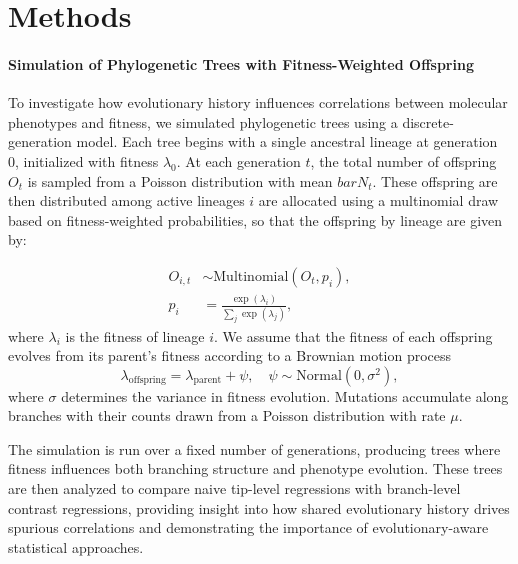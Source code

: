

\section{Methods}

\paragraph{Simulation of Phylogenetic Trees with Fitness-Weighted Offspring}%

To investigate how evolutionary history influences correlations between molecular phenotypes and fitness, we simulated phylogenetic trees using a discrete-generation model.
Each tree begins with a single ancestral lineage at generation 0, initialized with fitness $\lambda_0$.
At each generation $t$, the total number of offspring $O_{t}$ is sampled from a Poisson distribution with mean $bar{N}_t$.
These offspring are then distributed among active lineages $i$ are allocated using a multinomial draw based on fitness-weighted probabilities, so that the offspring by lineage are given by:

\begin{align*}
    O_{i, t} &\sim \text{Multinomial}\left(O_t, p_{i}\right),\\
    p_i &= \frac{\exp(\lambda_i)}{\sum_j \exp(\lambda_j)},
\end{align*}
where $\lambda_i$ is the fitness of lineage $i$.
We assume that the fitness of each offspring evolves from its parent’s fitness according to a Brownian motion process
\begin{equation*}
    \lambda_{\text{offspring}} = \lambda_{\text{parent}} + \psi, \quad \psi \sim \text{Normal}(0, \sigma^2),
\end{equation*}
where $\sigma$ determines the variance in fitness evolution.
Mutations accumulate along branches with their counts drawn from a Poisson distribution with rate $\mu$.

The simulation is run over a fixed number of generations, producing trees where fitness influences both branching structure and phenotype evolution.
These trees are then analyzed to compare naive tip-level regressions with branch-level contrast regressions, providing insight into how shared evolutionary history drives spurious correlations and demonstrating the importance of evolutionary-aware statistical approaches.

